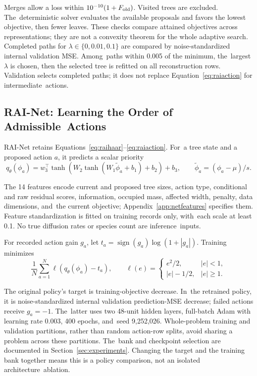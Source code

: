 \documentclass[mathematics,article,accept,moreauthors]{Definitions/mdpi}
\begin{document}
Merges allow a loss within $10^{-10}(1+F_{\rm old})$. Visited trees are excluded. The~deterministic solver evaluates the available proposals and favors the lowest objective, then fewer leaves. These checks compare attained objectives across representations; they are not a convexity theorem for the whole adaptive search. Completed paths for $\lambda\in\{0,0.01,0.1\}$ are compared by noise-standardized internal validation MSE. Among~paths within 0.005 of the minimum, the~largest $\lambda$ is chosen, then the selected tree is refitted on all reconstruction rows. Validation selects completed paths; it does not replace Equation~\eqref{eq:raiaction} for intermediate~actions.

\subsection{RAI-Net: Learning the Order of Admissible~Actions}\label{sec:rainetmath}
RAI-Net retains Equations~\eqref{eq:raihaar}--\eqref{eq:raiaction}. For~a tree state and a proposed action $a$, it predicts a scalar priority
\begin{equation}\label{eq:rainet}
 q_\theta(\phi_a)=w_3^\top\tanh\!\left(W_2\tanh(W_1\widetilde\phi_a+b_1)+b_2\right)+b_3,
 \qquad \widetilde\phi_a=(\phi_a-\mu)/s.
\end{equation}

The 14 features encode current and proposed tree sizes, action type, conditional and raw residual scores, information, occupied mass, affected width, penalty, data dimensions, and~the current objective; Appendix~\ref{app:netfeatures} specifies them. Feature standardization is fitted on training records only, with~each scale at least 0.1. No true diffusion rates or species count are inference~inputs.

For recorded action gain $g_a$, let $t_a=\operatorname{sign}(g_a)\log(1+|g_a|)$. Training minimizes
\begin{equation}\label{eq:netloss}
 \frac1N\sum_{a=1}^N\ell(q_\theta(\phi_a)-t_a),\qquad
 \ell(e)=\begin{cases}e^2/2,&|e|<1,\\|e|-1/2,&|e|\geq1.\end{cases}
\end{equation}

The original policy's target is training-objective decrease. In~the retrained policy, it is noise-standardized internal validation prediction-MSE decrease; failed actions receive \mbox{$g_a=-1$.} The~latter uses two 48-unit hidden layers, full-batch Adam with learning rate 0.003, 400 epochs, and~seed {9,252,026}. Whole-problem training and validation partitions, rather than random action-row splits, avoid sharing a problem across these partitions. The~bank and checkpoint selection are documented in Section~\ref{sec:experiments}. Changing the target and the training bank together means this is a policy comparison, not an isolated architecture~ablation.
\end{document}
